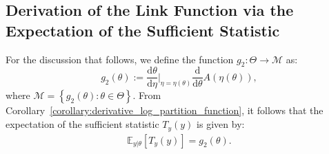 \subsection{Derivation of the Link Function via the Expectation of the Sufficient Statistic}

For the discussion that follows, we define the function $g_2 : \Theta \to \mathcal{M}$ as:
\begin{equation*}
    g_2(\theta) := \frac{\mathrm{d}\theta}{\mathrm{d}\eta}\Big|_{\eta = \eta(\theta)} \frac{\mathrm{d}}{\mathrm{d}\theta} A(\eta(\theta)),
\end{equation*}
where $\mathcal{M} = \left\{g_2(\theta): \theta \in \Theta \right\}$.
From Corollary~\ref{corollary:derivative_log_partition_function}, it follows that the expectation of the sufficient statistic $T_y(y)$ is given by:
\begin{align*}
    \mathbb{E}_{y|\theta}[T_y(y)] = g_2(\theta).
\end{align*}


